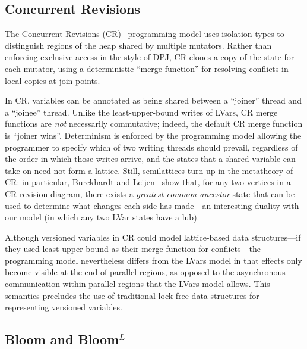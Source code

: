 \documentclass{article}
\begin{document}
\subsection{Concurrent Revisions}

The Concurrent Revisions (CR)~\cite{concurrent-revisions-haskell11}
programming model uses isolation types to distinguish regions of the
heap shared by multiple mutators.  Rather than enforcing exclusive
access in the style of DPJ, CR clones a copy of the state for each
mutator, using a deterministic ``merge function'' for resolving
conflicts in local copies at join points.

In CR, variables can be annotated as being shared between a ``joiner''
thread and a ``joinee'' thread.  Unlike the least-upper-bound writes
of LVars, CR merge functions are \emph{not} necessarily commutative;
indeed, the default CR merge function is ``joiner wins''.  Determinism
is enforced by the programming model allowing the programmer to
specify which of two writing threads should prevail, regardless of the
order in which those writes arrive, and the states that a shared
variable can take on need not form a lattice.  Still, semilattices
turn up in the metatheory of CR: in particular, Burckhardt and
Leijen~\cite{semantics-concurrent-revisions} show that, for any two
vertices in a CR revision diagram, there exists a \emph{greatest
  common ancestor} state that can be used to determine what changes
each side has made---an interesting duality with our model (in which
any two LVar states have a lub).

Although versioned variables in CR could model lattice-based data
structures---if they used least upper bound as their merge function
for conflicts---the programming model nevertheless differs from the
LVars model in that effects only become visible at the end of parallel
regions, as opposed to the asynchronous communication within parallel
regions that the LVars model allows.  This semantics precludes the use
of traditional lock-free data structures for representing versioned
variables.

\subsection{Bloom and Bloom$^L$}
\end{document}
